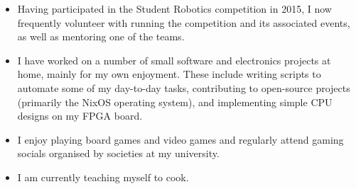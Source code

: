 
\begin{itemize}
  \item Having participated in the Student Robotics competition in 2015, I now frequently volunteer with running the competition and its associated events, as well as mentoring one of the teams.
  \item I have worked on a number of small software and electronics projects at home, mainly for my own enjoyment. These include writing scripts to automate some of my day-to-day tasks, contributing to open-source projects (primarily the NixOS operating system), and implementing simple CPU designs on my FPGA board.
  \item I enjoy playing board games and video games and regularly attend gaming socials organised by societies at my university.
  \item I am currently teaching myself to cook.
\end{itemize}
